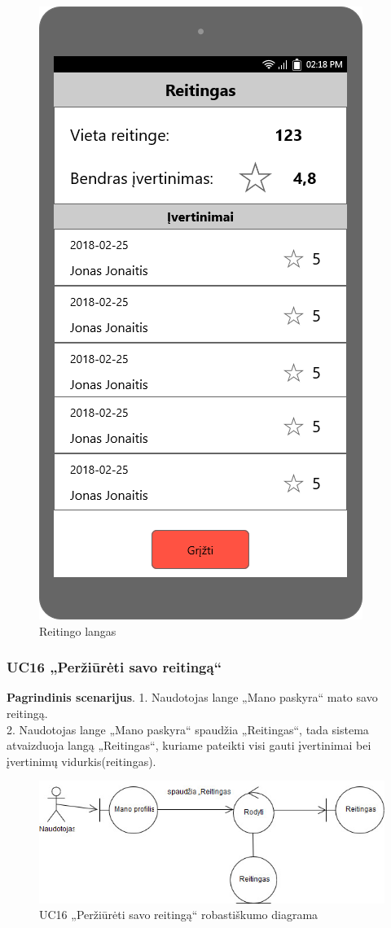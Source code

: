 \documentclass{VUMIFPSbakalaurinis}
\begin{document}
\begin{figure}[H]
	\centering
	\includegraphics[scale=0.4]{img/ScreenShots/Mano_profilis/06-Reitingas}
	\caption{Reitingo langas}
	\label{img:rating}
\end{figure}
\subsubsection{UC16 „Peržiūrėti savo reitingą“}
\textbf{Pagrindinis scenarijus}. 1. Naudotojas lange „Mano paskyra“ mato savo reitingą. \\
2. Naudotojas lange „Mano paskyra“ spaudžia „Reitingas“, tada sistema atvaizduoja langą „Reitingas“, kuriame pateikti visi gauti įvertinimai bei įvertinimų vidurkis(reitingas).

\begin{figure}[H]
	\centering
	\includegraphics[scale=0.6]{img/Robustness/UC16}
	\caption{UC16 „Peržiūrėti savo reitingą“ robastiškumo diagrama}
	\label{img:uc16rob}
\end{figure}
\end{document}
